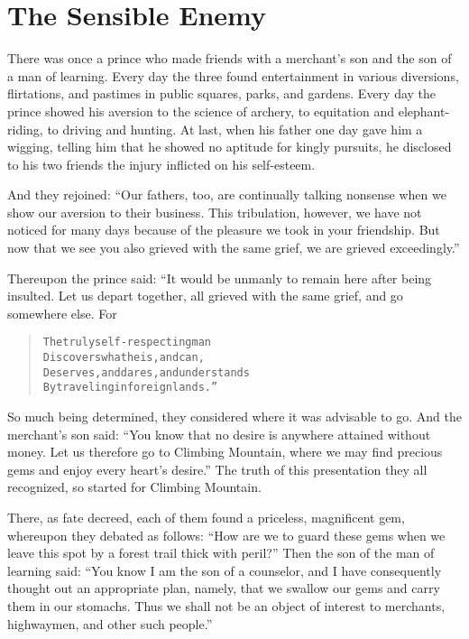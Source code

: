 \documentclass[article, twoside, 14pt]{memoir}
\renewenvironment{verbatim}{%
\begin{quote}%
\vskip -10pt%
\begin{alltt}\normalfont\large}{\end{alltt}%
\end{quote}%
\vskip -10pt
} %
\begin{document}
\chapter{The Sensible Enemy}

\label{s33}

There was once a prince who made friends with a merchant's son and
the son of a man of learning. Every day the three found
entertainment in various diversions, flirtations, and pastimes in
public squares, parks, and gardens. Every day the prince showed his
aversion to the science of archery, to equitation and
elephant-riding, to driving and hunting. At last, when his father
one day gave him a wigging, telling him that he showed no aptitude
for kingly pursuits, he disclosed to his two friends the injury
inflicted on his self-esteem.

And they rejoined:
``Our fathers, too, are continually talking nonsense when we show our aversion to their business. This tribulation, however, we have not noticed for many days because of the pleasure we took in your friendship. But now that we see you also grieved with the same grief, we are grieved exceedingly.''

Thereupon the prince said: “It would be unmanly to remain here
after being insulted. Let us depart together, all grieved with the
same grief, and go somewhere else. For

\begin{verbatim}
The truly self-respecting man
Discovers what he is, and can,
Deserves, and dares, and understands
By traveling in foreign lands.”
\end{verbatim}
So much being determined, they considered where it was advisable to
go. And the merchant's son said:
``You know that no desire is anywhere attained without money. Let us therefore go to Climbing Mountain, where we may find precious gems and enjoy every heart's desire.''
The truth of this presentation they all recognized, so started for
Climbing Mountain.

There, as fate decreed, each of them found a priceless, magnificent
gem, whereupon they debated as follows:
``How are we to guard these gems when we leave this spot by a forest trail thick with peril?''
Then the son of the man of learning said:
``You know I am the son of a counselor, and I have consequently thought out an appropriate plan, namely, that we swallow our gems and carry them in our stomachs. Thus we shall not be an object of interest to merchants, highwaymen, and other such people.''
\end{document}
